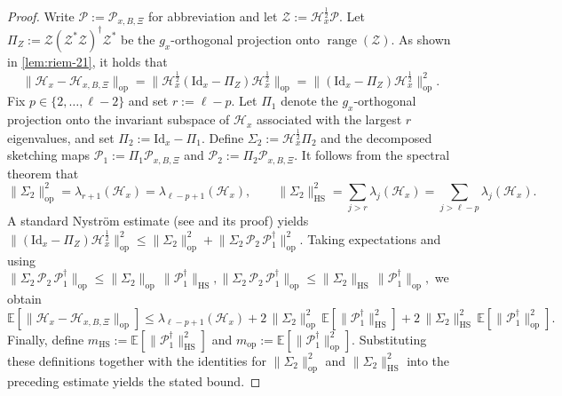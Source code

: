 \documentclass[final,onefignum,onetabnum]{siamart250211}
\begin{document}
\begin{proof}
Write $\mathcal P:=\mathcal P_{x,B,\Xi}$ for abbreviation and let $\mathcal Z:=\mathcal H_x^{\frac{1}{2}}\mathcal P$.
  Let $\Pi_Z:=\mathcal Z(\mathcal Z^{*}\mathcal Z)^{\dagger}\mathcal Z^{*}$ be the $g_x$-orthogonal projection onto $\operatorname{range}(\mathcal Z)$.
  As shown in \cref{lem:riem-21}, it holds that
  \[
  \|\mathcal H_x-\mathcal H_{x,B,\Xi}\|_{\mathrm{op}}
  =\big\|\mathcal H_x^{\frac{1}{2}}(\mathrm{Id}_x-\Pi_Z)\mathcal H_x^{\frac{1}{2}}\big\|_{\mathrm{op}}
  =\big\|(\mathrm{Id}_x-\Pi_Z)\mathcal H_x^{\frac{1}{2}}\big\|_{\mathrm{op}}^{2}.
  \]
  Fix $p\in\{2,\dots,\ell-2\}$ and set $r:=\ell-p$.
  Let $\Pi_1$ denote the $g_x$-orthogonal projection onto the invariant subspace of $\mathcal H_x$ associated with the largest $r$ eigenvalues, and set $\Pi_2:=\mathrm{Id}_x-\Pi_1$.
  Define $\Sigma_2:=\mathcal H_x^{\frac{1}{2}}\Pi_2$ and the decomposed sketching maps $\mathcal P_1:=\Pi_1 \mathcal P_{x,B,\Xi}$ and $\mathcal P_2:=\Pi_2 \mathcal P_{x,B,\Xi}$.
It follows from the spectral theorem that
  \[
  \|\Sigma_2\|_{\mathrm{op}}^{2}=\lambda_{r+1}(\mathcal H_x)=\lambda_{\ell-p+1}(\mathcal H_x),
  \qquad
  \|\Sigma_2\|_{\mathrm{HS}}^{2}=\sum_{j>r}\lambda_j(\mathcal H_x)=\sum_{j>\ell-p}\lambda_j(\mathcal H_x).
  \]
  A standard Nystr\"om estimate (see \cite[Proposition~2.2]{Frangella2023} and its proof) yields
  $
  \big\|(\mathrm{Id}_x-\Pi_Z)\mathcal H_x^{\frac{1}{2}}\big\|_{\mathrm{op}}^{2}
  \le
  \|\Sigma_2\|_{\mathrm{op}}^{2}
  +\big\|\Sigma_2\,\mathcal P_2\,\mathcal P_1^{\dagger}\big\|_{\mathrm{op}}^{2}
  $.
  Taking expectations and using 
  $
  \|\Sigma_2\,\mathcal P_2\,\mathcal P_1^{\dagger}\|_{\mathrm{op}}
  \le \|\Sigma_2\|_{\mathrm{op}}\,\|\mathcal P_1^{\dagger}\|_{\mathrm{HS}},
  \|\Sigma_2\,\mathcal P_2\,\mathcal P_1^{\dagger}\|_{\mathrm{op}}
  \le \|\Sigma_2\|_{\mathrm{HS}}\,\|\mathcal P_1^{\dagger}\|_{\mathrm{op}},
$
  we obtain
  \[
  \mathbb E [ \|\mathcal H_x-\mathcal H_{x,B,\Xi}\|_{\mathrm{op}} ]
  \le
  \lambda_{\ell-p+1}(\mathcal H_x)
  +2\,\|\Sigma_2\|_{\mathrm{op}}^{2}\,\mathbb E [ \|\mathcal P_1^{\dagger}\|_{\mathrm{HS}}^{2} ]
  +2\,\|\Sigma_2\|_{\mathrm{HS}}^{2}\,\mathbb E [ \|\mathcal P_1^{\dagger}\|_{\mathrm{op}}^{2} ].
  \]
  Finally, define
  $m_{\mathrm{HS}}:=\mathbb E [ \|\mathcal P_1^{\dagger}\|_{\mathrm{HS}}^{2} ]$
  and
  $m_{\mathrm{op}}:=\mathbb E [ \|\mathcal P_1^{\dagger}\|_{\mathrm{op}}^{2} ]$.
  Substituting these definitions together with the identities for $\|\Sigma_2\|_{\mathrm{op}}^{2}$ and $\|\Sigma_2\|_{\mathrm{HS}}^{2}$ into the preceding estimate yields the stated bound.
  \end{proof}
\end{document}
